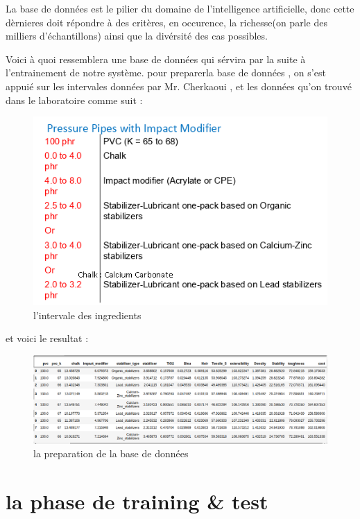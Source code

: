 \documentclass[11pt]{report}
\begin{document}
La base de données est le pilier du domaine de l'intelligence artificielle, donc cette dèrnieres doit répondre à des critères, en occurence, la richesse(on parle des milliers d'échantillons) ainsi que la divérsité des cas possibles.

Voici à quoi ressemblera une base de données qui sérvira par la suite à l'entrainement de notre système.
pour preparerla base de données , on s'est appuié sur les intervales données par Mr. Cherkaoui , et les données qu'on trouvé dans le laboratoire comme suit : 

\begin{figure}[H]
	\begin{center}
		\includegraphics[width=12cm]{images/intervale.png}
		\caption{l'intervale des ingredients}
		\label{fig:figure}
	\end{center}
\end{figure}

et voici le resultat :
\begin{figure}[H]
	\begin{center}
		\includegraphics[width=12cm]{images/data.png}
		\caption{la preparation de la base de données}
		\label{fig:figure}
	\end{center}
\end{figure}


\section{la phase de training \& test}
\end{document}

